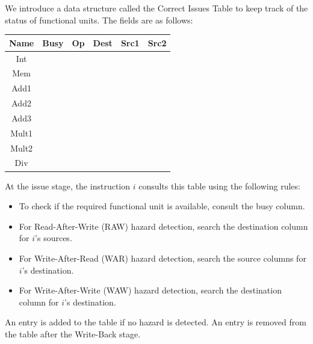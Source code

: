 We introduce a data structure called the Correct Issues Table to keep track of the status of functional units. 
The fields are as follows:
\begin{table}[H]
    \centering
    \begin{tabular}{|c|c|cccc|}
        \hline
    \textbf{Name} & \textbf{Busy} & \textbf{Op} & \textbf{Dest} & \textbf{Src1} & \textbf{Src2} \\ \hline
    Int           &               &             &               &               &               \\
    Mem           &               &             &               &               &               \\ \hline
    Add1          &               &             &               &               &               \\
    Add2          &               &             &               &               &               \\
    Add3          &               &             &               &               &               \\ \hline
    Mult1         &               &             &               &               &               \\
    Mult2         &               &             &               &               &               \\ \hline
    Div           &               &             &               &               &               \\ \hline
    \end{tabular}
\end{table}
At the issue stage, the instruction $i$ consults this table using the following rules:
\begin{itemize}
    \item To check if the required functional unit is available, consult the busy column.
    \item For Read-After-Write (RAW) hazard detection, search the destination column for $i$'s sources.
    \item For Write-After-Read (WAR) hazard detection, search the source columns for $i$'s destination.
    \item For Write-After-Write (WAW) hazard detection, search the destination column for $i$'s destination.
\end{itemize}
An entry is added to the table if no hazard is detected. 
An entry is removed from the table after the Write-Back stage.


